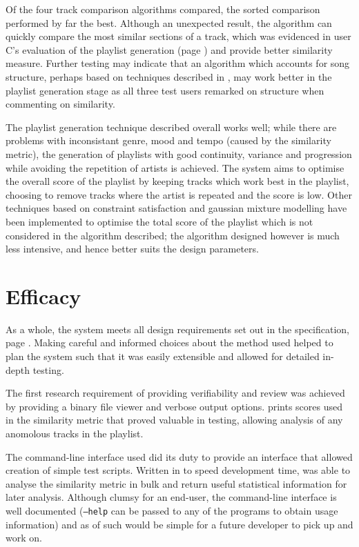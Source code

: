 Of the four track comparison algorithms compared, the sorted comparison performed by far the best. Although an unexpected result, the algorithm can quickly compare the most similar sections of a track, which was evidenced in user C's evaluation of the playlist generation (page \pageref{text:testing:user:blind:c}) and provide better similarity measure. Further testing may indicate that an algorithm which accounts for song structure, perhaps based on techniques described in \citet{Bruderer2006}, may work better in the playlist generation stage as all three test users remarked on structure when commenting on similarity.

The playlist generation technique described overall works well; while there are problems with inconsistant genre, mood and tempo (caused by the similarity metric), the generation of playlists with good continuity, variance and progression while avoiding the repetition of artists is achieved. The system aims to optimise the overall score of the playlist by keeping tracks which work best in the playlist, choosing to remove tracks where the artist is repeated and the score is low. Other techniques based on constraint satisfaction \citep{Vossen2005} and gaussian mixture modelling \citep{Aucouturier2003} have been implemented to optimise the total score of the playlist which is not considered in the algorithm described; the algorithm designed however is much less intensive, and hence better suits the design parameters.
\section{Efficacy}
As a whole, the system meets all design requirements set out in the specification, page \pageref{text:spec}. Making careful and informed choices about the method used helped to plan the system such that it was easily extensible and allowed for detailed in-depth testing.

The first research requirement of providing verifiability and review was achieved by providing a binary file viewer and verbose output options.  prints scores used in the similarity metric that proved valuable in testing, allowing analysis of any anomolous tracks in the playlist.

The command-line interface used did its duty to provide an interface that allowed creation of simple test scripts. Written in  to speed development time,  was able to analyse the similarity metric in bulk and return useful statistical information for later analysis. Although clumsy for an end-user, the command-line interface is well documented (\texttt{--help} can be passed to any of the programs to obtain usage information) and as of such would be simple for a future developer to pick up and work on.

